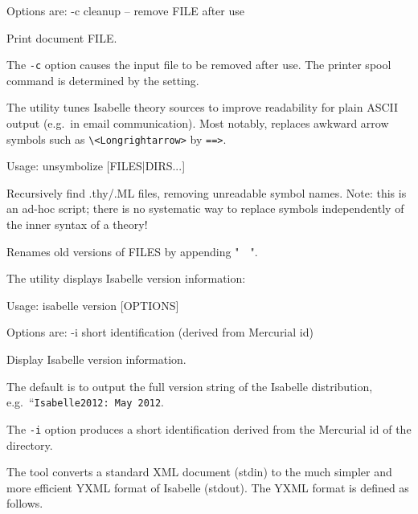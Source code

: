 \begin{isabellebody}
\begin{isamarkuptext}
\begin{ttbox}
  Options are:
    -c           cleanup -- remove FILE after use

  Print document FILE.
\end{ttbox}

  The \verb|-c| option causes the input file to be removed
  after use.  The printer spool command is determined by the \hyperlink{setting.PRINT-COMMAND}{\mbox{}} setting.%
\end{isamarkuptext}%
\isamarkuptrue%
%
\isamarkuptrue%
%
\begin{isamarkuptext}%
The \hypertarget{tool.unsymbolize}{\hyperlink{tool.unsymbolize}{\mbox{}}} utility tunes Isabelle theory sources to
  improve readability for plain ASCII output (e.g.\ in email
  communication).  Most notably, \hyperlink{tool.unsymbolize}{\mbox{}} replaces awkward
  arrow symbols such as \verb|\|\verb|<Longrightarrow>|
  by \verb|==>|.
\begin{ttbox}
Usage: unsymbolize [FILES|DIRS...]

  Recursively find .thy/.ML files, removing unreadable symbol names.
  Note: this is an ad-hoc script; there is no systematic way to replace
  symbols independently of the inner syntax of a theory!

  Renames old versions of FILES by appending "~~".
\end{ttbox}%
\end{isamarkuptext}%
\isamarkuptrue%
%
\isamarkuptrue%
%
\begin{isamarkuptext}%
The \hypertarget{tool.version}{\hyperlink{tool.version}{\mbox{}}} utility displays Isabelle version information:
\begin{ttbox}
Usage: isabelle version [OPTIONS]

  Options are:
    -i           short identification (derived from Mercurial id)

  Display Isabelle version information.
\end{ttbox}

  \medskip The default is to output the full version string of the
  Isabelle distribution, e.g.\ ``\verb|Isabelle2012: May 2012|.

  The \verb|-i| option produces a short identification derived
  from the Mercurial id of the \hyperlink{setting.ISABELLE-HOME}{\mbox{}} directory.%
\end{isamarkuptext}%
\isamarkuptrue%
%
\isamarkuptrue%
%
\begin{isamarkuptext}%
The \hypertarget{tool.yxml}{\hyperlink{tool.yxml}{\mbox{}}} tool converts a standard XML document (stdin)
  to the much simpler and more efficient YXML format of Isabelle
  (stdout).  The YXML format is defined as follows.


\end{isamarkuptext}
\end{isabellebody}
